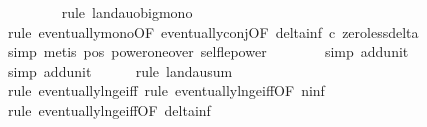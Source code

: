 \begin{isabellebody}
\ \ \ \ \ \ \ \isamarkupfalse%
\ {\isacharparenleft}{\kern0pt}rule\ landau{\isacharunderscore}{\kern0pt}o{\isachardot}{\kern0pt}big{\isacharunderscore}{\kern0pt}mono{\isacharparenright}{\kern0pt}\isanewline
\ \ \ \ \ \ \ \isamarkupfalse%
\ {\isacharparenleft}{\kern0pt}rule\ eventually{\isacharunderscore}{\kern0pt}mono{\isacharbrackleft}{\kern0pt}OF\ eventually{\isacharunderscore}{\kern0pt}conj{\isacharbrackleft}{\kern0pt}OF\ delta{\isacharunderscore}{\kern0pt}inf{\isacharbrackleft}{\kern0pt}\ c{\isacharequal}{\kern0pt}{\isachardoublequoteopen}{}{\isachardoublequoteclose}{\isacharbrackright}{\kern0pt}\ zero{\isacharunderscore}{\kern0pt}less{\isacharunderscore}{\kern0pt}delta{\isacharbrackright}{\kern0pt}{\isacharbrackright}{\kern0pt}{\isacharparenright}{\kern0pt}\isanewline
\ \ \ \ \ \ \ \isamarkupfalse%
\ {\isacharparenleft}{\kern0pt}simp{\isacharcomma}{\kern0pt}\ metis\ pos{}\ power{\isacharunderscore}{\kern0pt}one{\isacharunderscore}{\kern0pt}over\ self{\isacharunderscore}{\kern0pt}le{\isacharunderscore}{\kern0pt}power{\isacharparenright}{\kern0pt}\isanewline
\ \ \ \ \ \ \isamarkupfalse%
\ {\isacharparenleft}{\kern0pt}simp\ add{\isacharcolon}{\kern0pt}unit{\isacharunderscore}{\kern0pt}{}{\isacharparenright}{\kern0pt}\isanewline
\ \ \ \ \ \isamarkupfalse%
\ {\isacharparenleft}{\kern0pt}simp\ add{\isacharcolon}{\kern0pt}unit{\isacharunderscore}{\kern0pt}{}{\isacharparenright}{\kern0pt}\isanewline
\ \ \ \ \isamarkupfalse%
\ {\isacharparenleft}{\kern0pt}rule\ landau{\isacharunderscore}{\kern0pt}sum{\isacharunderscore}{\kern0pt}{}{\isacharparenright}{\kern0pt}\isanewline
\ \ \ \ \ \ \isamarkupfalse%
\ {\isacharparenleft}{\kern0pt}rule\ eventually{\isacharunderscore}{\kern0pt}ln{\isacharunderscore}{\kern0pt}ge{\isacharunderscore}{\kern0pt}iff{\isacharcomma}{\kern0pt}\ rule\ eventually{\isacharunderscore}{\kern0pt}ln{\isacharunderscore}{\kern0pt}ge{\isacharunderscore}{\kern0pt}iff{\isacharbrackleft}{\kern0pt}OF\ n{\isacharunderscore}{\kern0pt}inf{\isacharbrackright}{\kern0pt}{\isacharparenright}{\kern0pt}\isanewline
\ \ \ \ \ \isamarkupfalse%
\ {\isacharparenleft}{\kern0pt}rule\ eventually{\isacharunderscore}{\kern0pt}ln{\isacharunderscore}{\kern0pt}ge{\isacharunderscore}{\kern0pt}iff{\isacharbrackleft}{\kern0pt}OF\ delta{\isacharunderscore}{\kern0pt}inf{\isacharbrackright}{\kern0pt}{\isacharparenright}{\kern0pt}\isanewline
\ \ \ \ \isamarkupfalse%

\end{isabellebody}
